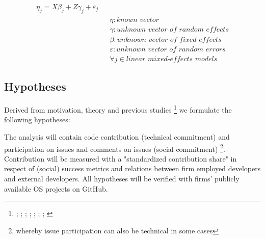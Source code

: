 \begin{align}
	\eta_{j} = X\beta_{j} + Z\gamma_{j} + \varepsilon_{j} \\
	& & \eta : \textit{known vector} \nonumber \\
	& & \gamma : \textit{unknown vector of random effects} \nonumber \\
	& & \beta : \textit{unknown vector of fixed effects} \nonumber \\
	& & \varepsilon : \textit{unknown vector of random errors} \nonumber \\
	& & \forall j \in \textit{linear mixed-effects models} \nonumber
\end{align}

\clearpage
\subsection{Hypotheses}
\label{sec:hypotheses}

Derived from motivation, theory and previous studies \footnote{\cite{hill2009idea}; \cite{dahlander2014open}; \cite{piezunka2013study}; \cite{dahlander2005relationships}; \cite{alexy2012managing}; \cite{tsay2014influence}; \cite{west2006challenges}; \cite{krishnamurthy2016peripheral}} we formulate the following hypotheses:



The analysis will contain code contribution (technical commitment) and participation on issues and comments on issues (social commitment) \footnote{whereby issue participation can also be technical in some cases}. Contribution will be measured with a "standardized contribution share" in respect of (social) success metrics and relations between firm employed developers and external developers. All hypotheses will be verified with firms' publicly available OS projects on GitHub.
